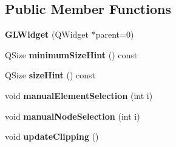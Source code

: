 \subsection*{Public Member Functions}
\begin{DoxyCompactItemize}
\item 
\hypertarget{classGLWidget_ab79c391c86de1ffb76f6950b49d82c0c}{}{\bfseries G\+L\+Widget} (Q\+Widget $\ast$parent=0)\label{classGLWidget_ab79c391c86de1ffb76f6950b49d82c0c}

\item 
\hypertarget{classGLWidget_ade3142625c1bfda0576e419b176cf8b1}{}Q\+Size {\bfseries minimum\+Size\+Hint} () const \label{classGLWidget_ade3142625c1bfda0576e419b176cf8b1}

\item 
\hypertarget{classGLWidget_a57698bc426052845b43a135a13540154}{}Q\+Size {\bfseries size\+Hint} () const \label{classGLWidget_a57698bc426052845b43a135a13540154}

\item 
\hypertarget{classGLWidget_ad425870ac081f6814c5bdb794e6e4c21}{}void {\bfseries manual\+Element\+Selection} (int i)\label{classGLWidget_ad425870ac081f6814c5bdb794e6e4c21}

\item 
\hypertarget{classGLWidget_a21f7a00a668f6ab6c5a9b1491e30c43e}{}void {\bfseries manual\+Node\+Selection} (int i)\label{classGLWidget_a21f7a00a668f6ab6c5a9b1491e30c43e}

\item 
\hypertarget{classGLWidget_ad569f9af7f5bbbfee5f1810d07107f20}{}void {\bfseries update\+Clipping} ()\label{classGLWidget_ad569f9af7f5bbbfee5f1810d07107f20}

\end{DoxyCompactItemize}
